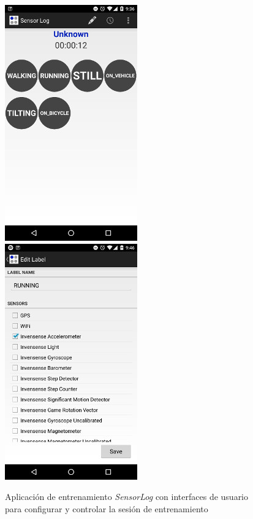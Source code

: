 \begin{figure}[!tbph]
\begin{centering}
\includegraphics[scale=0.8]{capitulo-4/graphics/sensorlog1}\includegraphics[scale=0.8]{capitulo-4/graphics/sensorlog2}
\par\end{centering}
\caption[Aplicación de entrenamiento SensorLog]{\label{fig4:sensor-log}Aplicación de entrenamiento \emph{SensorLog
}con interfaces de usuario para configurar y controlar la sesión de
entrenamiento}
\end{figure}

